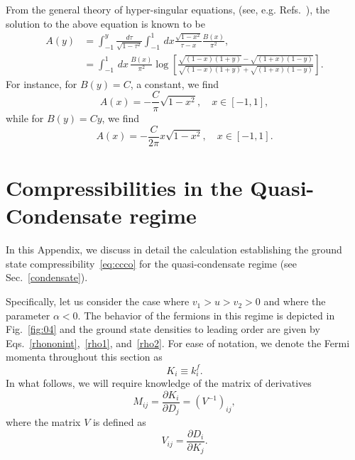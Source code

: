 \documentclass[aps,pra,
superscriptaddress,
reprint,twocolumn,preprintnumbers,
amsmath,amssymb,
nofootinbib]{revtex4-1}
\newcommand{\beq}{\begin{equation}}
\newcommand{\eeq}{\end{equation}}
\newcommand{\p}{\partial}
\begin{document}
From the general theory of hyper-singular equations, (see, e.g. Refs.~\cite{Muskh, Lifanov}), the solution to the above equation is known to be
		\begin{align}
		A(y) &= \int_{-1}^{y} \frac{d\tau}{\sqrt{1 - \tau^2}} \int_{-1}^1 \, dx \frac{\sqrt{1 - x^2}}{\tau - x} \frac{B(x)}{\pi^2} ,\nonumber \\
		&= \int_{-1}^1 \, dx\,\frac{B(x)}{\pi^2} \log\left[ \frac{\sqrt{(1 - x)(1 + y)} - \sqrt{(1 + x)(1 - y)}}{\sqrt{(1 - x)(1 + y)} + \sqrt{(1 + x)(1 - y)}} \right].
		\end{align}
For instance, for $B(y) = C$, a constant, we find
		\begin{equation}
		A(x) = -\frac{C}{\pi}\sqrt{1 - x^2} ,\quad x\in [-1,1],
		\end{equation}				
while for $B(y) = C y$, we find
		\begin{equation}
		A(x) = -\frac{C}{2\pi} x \sqrt{1 - x^2} ,\quad x\in [-1,1].
		\end{equation}
		

	\section{Compressibilities in the Quasi-Condensate regime}
	\label{app:F}		

In this Appendix, we discuss in detail the calculation establishing the ground state compressibility~\eqref{eq:ccco} for the quasi-condensate regime (see Sec.~\ref{condensate}). 

Specifically, let us consider the case where $v_1>u>v_2>0$ and where the parameter $\alpha<0$. The behavior of the fermions in this regime is depicted in Fig.~\ref{fig:04} and the ground state densities to leading order are given by Eqs.~\eqref{rhononint},~\eqref{rho1}, and~\eqref{rho2}. For ease of notation, we denote the Fermi momenta throughout this section as
\beq
K_i \equiv k_i^f.
\eeq
In what follows, we will require knowledge of the matrix of derivatives
\beq
M_{ij} = \frac{\p K_i}{\p D_j} = (V^{-1})_{ij},
\eeq
where the matrix $V$ is defined as
\beq
V_{ij} = \frac{\p D_i}{\p K_j}.
\eeq
\end{document}
